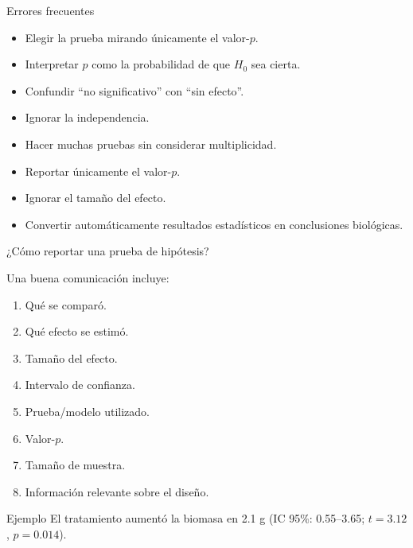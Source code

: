 \begin{frame}{Errores frecuentes}

\begin{itemize}
    \item Elegir la prueba mirando únicamente el valor-$p$.
    \item Interpretar $p$ como la probabilidad de que $H_0$ sea cierta.
    \item Confundir ``no significativo'' con ``sin efecto''.
    \item Ignorar la independencia.
    \item Hacer muchas pruebas sin considerar multiplicidad.
    \item Reportar únicamente el valor-$p$.
    \item Ignorar el tamaño del efecto.
    \item Convertir automáticamente resultados estadísticos en conclusiones
    biológicas.
\end{itemize}

\end{frame}

\begin{frame}{¿Cómo reportar una prueba de hipótesis?}

Una buena comunicación incluye:

\begin{enumerate}
    \item Qué se comparó.
    \item Qué efecto se estimó.
    \item Tamaño del efecto.
    \item Intervalo de confianza.
    \item Prueba/modelo utilizado.
    \item Valor-$p$.
    \item Tamaño de muestra.
    \item Información relevante sobre el diseño.
\end{enumerate}

\vspace{0.3cm}

\begin{block}{Ejemplo}
El tratamiento aumentó la biomasa en 2.1 g
(IC 95\%: 0.55--3.65; $t=3.12$, $p=0.014$).
\end{block}

\end{frame}

